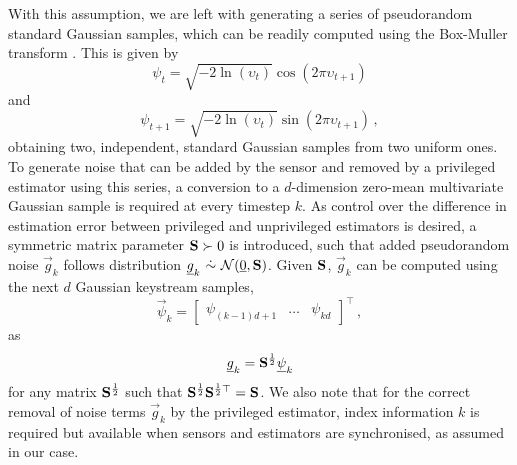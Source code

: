 With this assumption, we are left with generating a series of pseudorandom standard Gaussian samples, which can be readily computed using the Box-Muller transform \cite{paleyFourierTransformsComplex1934}. This is given by
\begin{equation}
    \psi_t = \sqrt{-2\ln (\upsilon_t)}\cos(2\pi \upsilon_{t+1})
\end{equation}
and
\begin{equation}
    \psi_{t+1} = \sqrt{-2\ln (\upsilon_t)}\sin(2\pi \upsilon_{t+1})\,,
\end{equation}
obtaining two, independent, standard Gaussian samples from two uniform ones. To generate noise that can be added by the sensor and removed by a privileged estimator using this series, a conversion to a $d$-dimension zero-mean multivariate Gaussian sample is required at every timestep $k$. As control over the difference in estimation error between privileged and unprivileged estimators is desired, a symmetric matrix parameter ${{\mathbf{S}}}\succ 0$ is introduced, such that added pseudorandom noise $\vec{g}_k$ follows distribution $\vec{g}_k\ \dot{\sim}\ \mathcal{N}(\vec{0},\mat{S})$. Given ${{\mathbf{S}}}$, $\vec{g}_k$ can be computed using the next $d$ Gaussian keystream samples,
\begin{equation}\label{eq:priv_estimation:est_gaussian_standard_noise_stream}
    \vec{\psi}_k =
    \begin{bmatrix}
        \psi_{(k-1)d+1} & \dots & \psi_{kd}
    \end{bmatrix}^\top\,,
\end{equation}
as
\begin{equation}\label{eq:priv_estimation:est_gaussian_noise_stream}
    {\underline{g}}_k = {{\mathbf{S}}}^{\frac{1}{2}}{\underline{\psi}}_k
\end{equation}
for any matrix ${{\mathbf{S}}}^{\frac{1}{2}}$ such that ${{\mathbf{S}}}^{\frac{1}{2}}{{\mathbf{S}}}^{\frac{1}{2}\top}={{\mathbf{S}}}$. We also note that for the correct removal of noise terms $\vec{g}_k$ by the privileged estimator, index information $k$ is required but available when sensors and estimators are synchronised, as assumed in our case.

% 
% 

